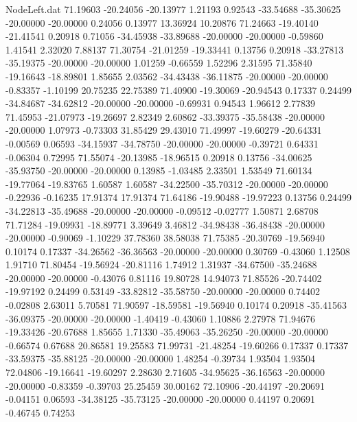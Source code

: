 \begin{filecontents}{NodeLeft.dat}
  71.19603  -20.24056  -20.13977     1.21193    0.92543  -33.54688  -35.30625  -20.00000  -20.00000    0.24056    0.13977   13.36924   10.20876
  71.24663  -19.40140  -21.41541     0.20918    0.71056  -34.45938  -33.89688  -20.00000  -20.00000   -0.59860    1.41541    2.32020    7.88137
  71.30754  -21.01259  -19.33441     0.13756    0.20918  -33.27813  -35.19375  -20.00000  -20.00000    1.01259   -0.66559    1.52296    2.31595
  71.35840  -19.16643  -18.89801     1.85655    2.03562  -34.43438  -36.11875  -20.00000  -20.00000   -0.83357   -1.10199   20.75235   22.75389
  71.40900  -19.30069  -20.94543     0.17337    0.24499  -34.84687  -34.62812  -20.00000  -20.00000   -0.69931    0.94543    1.96612    2.77839
  71.45953  -21.07973  -19.26697     2.82349    2.60862  -33.39375  -35.58438  -20.00000  -20.00000    1.07973   -0.73303   31.85429   29.43010
  71.49997  -19.60279  -20.64331    -0.00569    0.06593  -34.15937  -34.78750  -20.00000  -20.00000   -0.39721    0.64331   -0.06304    0.72995
  71.55074  -20.13985  -18.96515     0.20918    0.13756  -34.00625  -35.93750  -20.00000  -20.00000    0.13985   -1.03485    2.33501    1.53549
  71.60134  -19.77064  -19.83765     1.60587    1.60587  -34.22500  -35.70312  -20.00000  -20.00000   -0.22936   -0.16235   17.91374   17.91374
  71.64186  -19.90488  -19.97223     0.13756    0.24499  -34.22813  -35.49688  -20.00000  -20.00000   -0.09512   -0.02777    1.50871    2.68708
  71.71284  -19.09931  -18.89771     3.39649    3.46812  -34.98438  -36.48438  -20.00000  -20.00000   -0.90069   -1.10229   37.78360   38.58038
  71.75385  -20.30769  -19.56940     0.10174    0.17337  -34.26562  -36.36563  -20.00000  -20.00000    0.30769   -0.43060    1.12508    1.91710
  71.80454  -19.56924  -20.81116     1.74912    1.31937  -34.67500  -35.24688  -20.00000  -20.00000   -0.43076    0.81116   19.80728   14.94073
  71.85526  -20.74402  -19.97192     0.24499    0.53149  -33.82812  -35.58750  -20.00000  -20.00000    0.74402   -0.02808    2.63011    5.70581
  71.90597  -18.59581  -19.56940     0.10174    0.20918  -35.41563  -36.09375  -20.00000  -20.00000   -1.40419   -0.43060    1.10886    2.27978
  71.94676  -19.33426  -20.67688     1.85655    1.71330  -35.49063  -35.26250  -20.00000  -20.00000   -0.66574    0.67688   20.86581   19.25583
  71.99731  -21.48254  -19.60266     0.17337    0.17337  -33.59375  -35.88125  -20.00000  -20.00000    1.48254   -0.39734    1.93504    1.93504
  72.04806  -19.16641  -19.60297     2.28630    2.71605  -34.95625  -36.16563  -20.00000  -20.00000   -0.83359   -0.39703   25.25459   30.00162
  72.10906  -20.44197  -20.20691    -0.04151    0.06593  -34.38125  -35.73125  -20.00000  -20.00000    0.44197    0.20691   -0.46745    0.74253

\end{filecontents}

